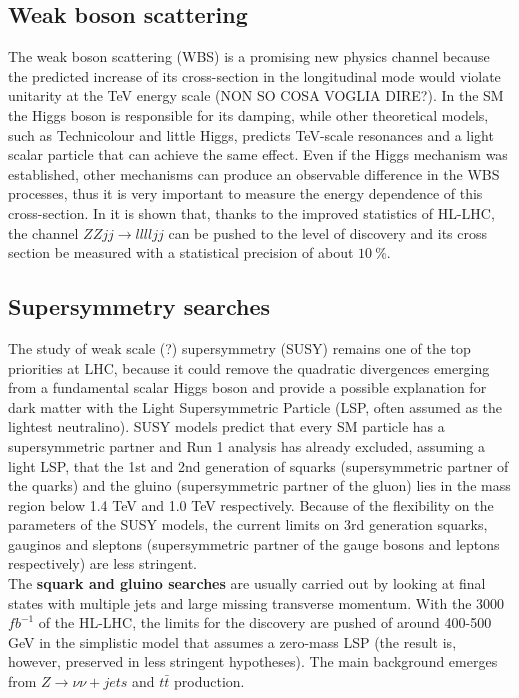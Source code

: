 \documentclass[a4paper,twoside,12pt]{article}
\begin{document}
\subsection{Weak boson scattering}
The weak boson scattering (WBS) is a promising new physics channel because the predicted increase of
its cross-section
in the longitudinal mode would violate unitarity at the TeV energy scale (NON SO COSA VOGLIA DIRE?). In the SM the Higgs
boson is responsible for its damping, while other theoretical models, such as Technicolour and 
little Higgs, predicts TeV-scale resonances and a light scalar particle that can achieve the same effect. Even if the Higgs
mechanism was established, other mechanisms can produce an observable difference in
the WBS processes, thus it is very important to measure the energy 
dependence of this cross-section. In \cite{WBS} it is shown that, thanks to the improved
statistics of HL-LHC, the channel $ZZjj \rightarrow lllljj$ can be pushed to the level of discovery and its cross section be measured with a statistical precision of about $10\ \%$.

\subsection{Supersymmetry searches}
The study of weak scale (?) supersymmetry (SUSY) remains one of the top priorities at LHC, because
it could remove the quadratic divergences emerging from a fundamental scalar Higgs boson and provide a possible explanation for dark matter with the Light Supersymmetric Particle (LSP, often assumed as the lightest neutralino).
SUSY models predict that every SM particle has a supersymmetric partner and Run 1 analysis
has already excluded, assuming a light LSP, that the 1st and 2nd generation of squarks (supersymmetric partner of the quarks) and the gluino (supersymmetric partner of the gluon) lies in the mass region below 1.4 TeV and 1.0
TeV respectively. Because of the flexibility on the parameters of the SUSY models, 
the current limits on 3rd generation squarks, gauginos and sleptons (supersymmetric partner
of the gauge bosons and leptons respectively) are less stringent.\\

The \textbf{squark and gluino searches} are usually carried out by looking at final states
with multiple jets and large missing transverse momentum. With the 3000 $fb^{-1}$ of the 
HL-LHC, the limits for the discovery are pushed of around 400-500 GeV\cite{loi} in the 
simplistic model that assumes a zero-mass LSP (the result is, however, preserved in less
stringent hypotheses). The main background emerges from $Z \rightarrow \nu\nu + jets$ and 
$t\bar{t}$ production.\\
\end{document}

